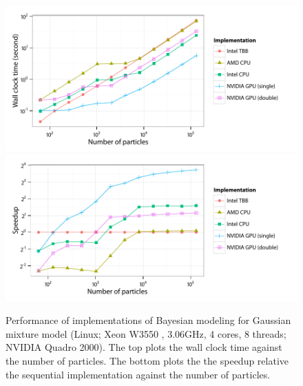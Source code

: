 \begin{figure}
  \UseAltLinespread
  \includegraphics[width=\linewidth]{fig_src/bench-ocl-time-running}
  \includegraphics[width=\linewidth]{fig_src/bench-ocl-speedup-running}
  \caption[Performance of \protect\vsmc \protect\opencl implementations]
  {Performance of \opencl implementations of Bayesian modeling for Gaussian mixture model (Linux; Xeon W3550 \gpu, 3.06GHz, 4 cores, 8 threads; NVIDIA Quadro 2000). The top plots the wall clock time against the number of particles. The bottom plots the the speedup relative the sequential implementation against the number of particles.}
  \label{fig:bench-ocl-perf}
\end{figure}
